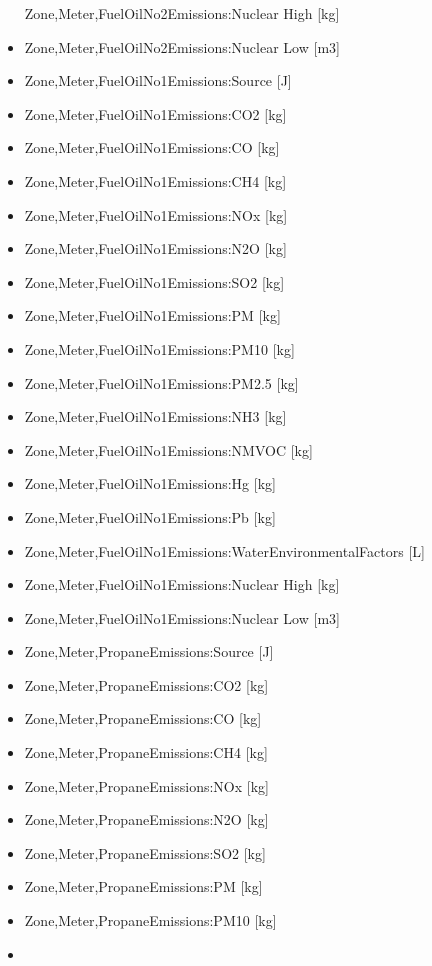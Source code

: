 \begin{itemize}
  Zone,Meter,FuelOilNo2Emissions:Nuclear High {[}kg{]}
\item
  Zone,Meter,FuelOilNo2Emissions:Nuclear Low {[}m3{]}
\item
  Zone,Meter,FuelOilNo1Emissions:Source {[}J{]}
\item
  Zone,Meter,FuelOilNo1Emissions:CO2 {[}kg{]}
\item
  Zone,Meter,FuelOilNo1Emissions:CO {[}kg{]}
\item
  Zone,Meter,FuelOilNo1Emissions:CH4 {[}kg{]}
\item
  Zone,Meter,FuelOilNo1Emissions:NOx {[}kg{]}
\item
  Zone,Meter,FuelOilNo1Emissions:N2O {[}kg{]}
\item
  Zone,Meter,FuelOilNo1Emissions:SO2 {[}kg{]}
\item
  Zone,Meter,FuelOilNo1Emissions:PM {[}kg{]}
\item
  Zone,Meter,FuelOilNo1Emissions:PM10 {[}kg{]}
\item
  Zone,Meter,FuelOilNo1Emissions:PM2.5 {[}kg{]}
\item
  Zone,Meter,FuelOilNo1Emissions:NH3 {[}kg{]}
\item
  Zone,Meter,FuelOilNo1Emissions:NMVOC {[}kg{]}
\item
  Zone,Meter,FuelOilNo1Emissions:Hg {[}kg{]}
\item
  Zone,Meter,FuelOilNo1Emissions:Pb {[}kg{]}
\item
  Zone,Meter,FuelOilNo1Emissions:WaterEnvironmentalFactors {[}L{]}
\item
  Zone,Meter,FuelOilNo1Emissions:Nuclear High {[}kg{]}
\item
  Zone,Meter,FuelOilNo1Emissions:Nuclear Low {[}m3{]}
\item
  Zone,Meter,PropaneEmissions:Source {[}J{]}
\item
  Zone,Meter,PropaneEmissions:CO2 {[}kg{]}
\item
  Zone,Meter,PropaneEmissions:CO {[}kg{]}
\item
  Zone,Meter,PropaneEmissions:CH4 {[}kg{]}
\item
  Zone,Meter,PropaneEmissions:NOx {[}kg{]}
\item
  Zone,Meter,PropaneEmissions:N2O {[}kg{]}
\item
  Zone,Meter,PropaneEmissions:SO2 {[}kg{]}
\item
  Zone,Meter,PropaneEmissions:PM {[}kg{]}
\item
  Zone,Meter,PropaneEmissions:PM10 {[}kg{]}
\item

\end{itemize}
